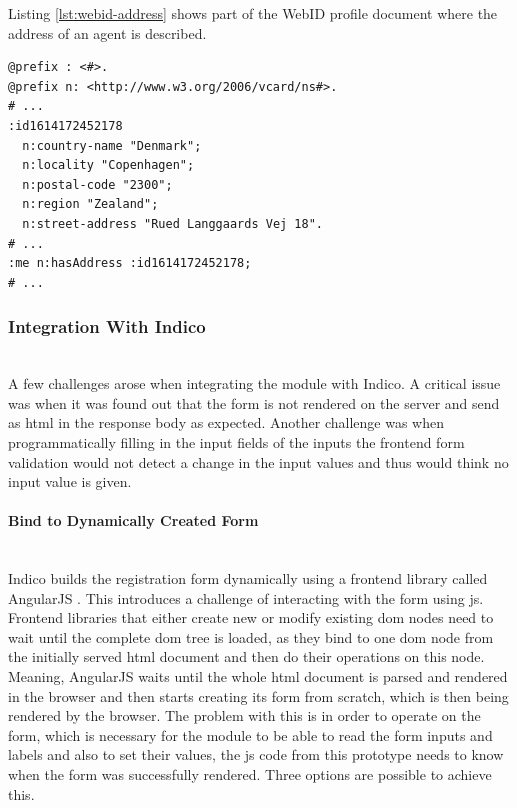 Listing \ref{lst:webid-address} shows part of the WebID profile document where the address of an agent is described.

\begin{lstlisting}[language=Other,columns=fullflexible, caption={Extraction from WebID profile document showing address.}, label={lst:webid-address}]
@prefix : <#>.
@prefix n: <http://www.w3.org/2006/vcard/ns#>.
# ...
:id1614172452178
  n:country-name "Denmark";
  n:locality "Copenhagen";
  n:postal-code "2300";
  n:region "Zealand";
  n:street-address "Rued Langgaards Vej 18". 
# ...
:me n:hasAddress :id1614172452178;
# ...
\end{lstlisting}

\vspace{0.5cm}
\subsubsection{Integration With Indico}\mbox{}\\

A few challenges arose when integrating the module with Indico. A critical issue was when it was found out that the form is not rendered on the server and send as \gls{html} in the response body as expected. Another challenge was when programmatically filling in the input fields of the inputs the frontend form validation would not detect a change in the input values and thus would think no input value is given.

\vspace{0.5cm}
\paragraph{Bind to Dynamically Created Form}\mbox{}\\

Indico builds the registration form dynamically using a frontend library called AngularJS \cite{angularjs}. This introduces a challenge of interacting with the form using \gls{js}. Frontend libraries that either create new or modify existing \gls{dom} nodes need to wait until the complete \gls{dom} tree is loaded, as they bind to one \gls{dom} node from the initially served \gls{html} document and then do their operations on this node. Meaning, AngularJS waits until the whole \gls{html} document is parsed and rendered in the browser and then starts creating its form from scratch, which is then being rendered by the browser. The problem with this is in order to operate on the form, which is necessary for the module to be able to read the form inputs and labels and also to set their values, the \gls{js} code from this prototype needs to know when the form was successfully rendered. Three options are possible to achieve this.

